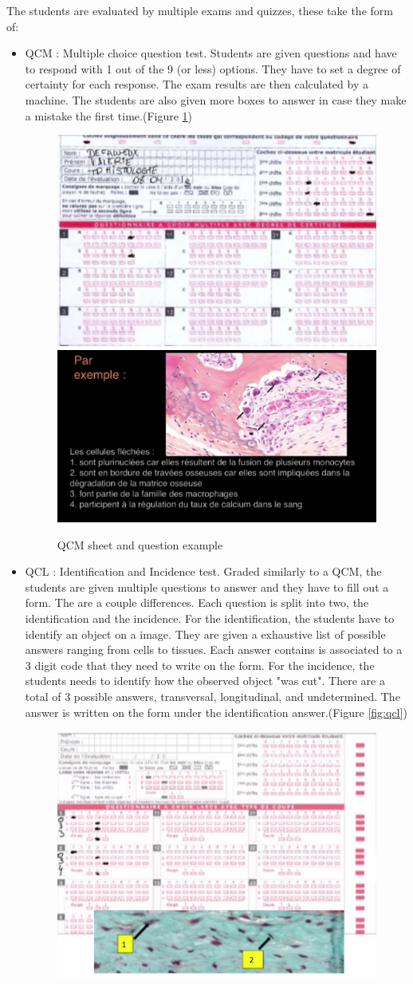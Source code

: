 \documentclass[a4paper,11pt]{report}
\numberwithin{figure}{section} %
\begin{document}
	The students are evaluated by multiple exams and quizzes, these take the form of:
    \begin{itemize}
    \item[\textbullet]  QCM : Multiple choice question test.
    Students are given questions and have to respond with 1 out of the 9 (or less) options.
    They have to set a degree of certainty for each response.
    The exam results are then calculated by a machine.
    The students are also given more boxes to answer in case they make a mistake the first time.(Figure \ref{fig:qcm})
    \begin{figure}[H]
    \centering
     \includegraphics[width=0.4\linewidth]{exam_qcm.png}
     \includegraphics[width=0.5\linewidth]{exam_qcm2.png}
     \caption{QCM sheet and question example}
     \label{fig:qcm}
    \end{figure}
	\item[\textbullet]  QCL : Identification and Incidence test.
	Graded similarly to a QCM, the students are given multiple questions to answer and they have to fill out a form.
	The are a couple differences.
	Each question is split into two, the identification and the incidence.
	For the identification, the students have to identify an object on a image.
	They are given a exhaustive list of possible answers ranging from cells to tissues.
	Each answer contains is associated to a 3 digit code that they need to write on the form.
	For the incidence, the students needs to identify how the observed object "was cut".
	There are a total of 3 possible answers, transversal, longitudinal, and undetermined.
	The answer is written on the form under the identification answer.(Figure \ref{fig:qcl})
      \begin{figure}[H]
    \centering
     \includegraphics[width=0.42\linewidth]{exam_qcl2.png}

\end{figure}
\end{itemize}
\end{document}
